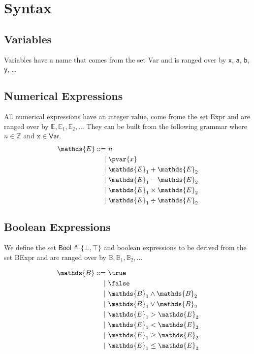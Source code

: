 \section{Syntax}

\subsection{Variables}

Variables have a name that comes from the set \textsf{Var} and is ranged over by \texttt{x}, \texttt{a}, \texttt{b}, \texttt{y}, \ldots

\subsection{Numerical Expressions}

All numerical expressions have an integer value, come frome the set \textsf{Expr} and are ranged over by $\mathds{E}, \mathds{E}_1, \mathds{E}_2, \ldots$ They can be built from the following grammar where $n \in \mathds{Z}$ and $\mathtt{x} \in \mathsf{Var}$.
\begin{align*}
\mathds{E} ::=&
\ n \\
|&\ \pvar{x} \\
|&\ \mathds{E}_1 + \mathds{E}_2 \\
|&\ \mathds{E}_1 - \mathds{E}_2 \\
|&\ \mathds{E}_1 \times \mathds{E}_2 \\
|&\ \mathds{E}_1 \div \mathds{E}_2 \\
\end{align*}

\subsection{Boolean Expressions}

We define the set $\mathsf{Bool} \triangleq \{ \bot, \top \}$ and boolean expressions to be derived from the set \textsf{BExpr} and are ranged over by $\mathds{B}, \mathds{B}_1, \mathds{B}_2, \ldots$

\begin{align*}
\mathds{B} ::=&
\ \true \\
|&\ \false \\
|&\ \mathds{B}_1 \land \mathds{B}_2 \\
|&\ \mathds{B}_1 \lor \mathds{B}_2 \\
|&\ \mathds{E}_1 > \mathds{E}_2 \\
|&\ \mathds{E}_1 < \mathds{E}_2 \\
|&\ \mathds{E}_1 \geq \mathds{E}_2 \\
|&\ \mathds{E}_1 \leq \mathds{E}_2 \\
\end{align*}

